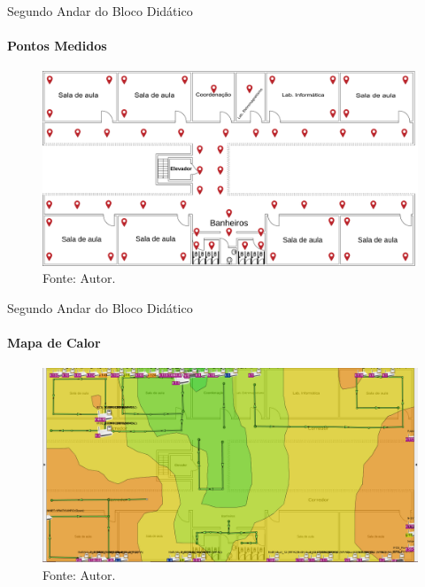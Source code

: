 \documentclass[aspectratio=169,12pt]{beamer}
\begin{document}
\begin{frame}{Segundo Andar do Bloco Didático}
	\framesubtitle{Pontos Medidos}
	\vspace*{-3mm}
	\begin{figure}[H]
		\centering
		\caption*{{\fontsize{9pt}{11}\selectfont Pontos medidos no 2º andar.}}
		\includegraphics[scale=0.12]{fig_tcc/Pontos_Medidos_Andar02.pdf}
		\caption*{{\fontsize{9pt}{11}\selectfont Fonte: Autor.}}
	\end{figure}
\end{frame}
\begin{frame}{Segundo Andar do Bloco Didático}
	\framesubtitle{Mapa de Calor}
	\vspace*{-3mm}
	\begin{figure}[H]
		\centering
		\caption*{{\fontsize{9pt}{11}\selectfont Mapa de calor do 2º andar.}}
		\includegraphics[scale=0.28]{fig_tcc/heatmapper_2_andar.png}
		\caption*{{\fontsize{8pt}{11}\selectfont Fonte: Autor.}}
	\end{figure}
\end{frame}
\end{document}
